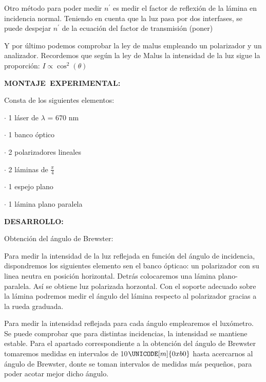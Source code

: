 \documentclass[12pt,thmsa]{article}
\begin{document}
\vspace{1pt}

Otro m\'{e}todo para poder medir $n^{\prime }$ es medir el factor de
reflexi\'{o}n de la l\'{a}mina en incidencia normal. Teniendo en cuenta que
la luz pasa por dos interfases, se puede despejar $n^{\prime }$ de la
ecuaci\'{o}n del factor de transmisi\'{o}n (poner)

\vspace{1pt}

Y por \'{u}ltimo podemos comprobar la ley de malus empleando un polarizador
y un analizador. Recordemos que seg\'{u}n la ley de Malus la intensidad de
la luz sigue la proporci\'{o}n: $I\varpropto \cos ^{2}(\theta )$

\vspace{1pt}

\textbf{MONTAJE\ EXPERIMENTAL: }

Consta de los siguientes elementos:

$\cdot$ 1 l\'{a}ser de $\lambda $ = 670 nm

$\cdot$ 1 banco \'{o}ptico

$\cdot$ 2 polarizadores lineales

$\cdot $ 2 l\'{a}minas de $\frac{\pi }{4}$

$\cdot$ 1 espejo plano

$\cdot $ 1 l\'{a}mina plano paralela

\vspace{1pt}

\textbf{DESARROLLO:}

\vspace{1pt}Obtenci\'{o}n del \'{a}ngulo de Brewster:

Para medir la intensidad de la luz reflejada en funci\'{o}n del \'{a}ngulo
de incidencia, dispondremos los siguientes elemento sen el banco
\'{o}pticao: un polarizador con su linea neutra en posici\'{o}n horizontal.
Detr\'{a}s colocaremos una l\'{a}mina plano-paralela. As\'{i} se obtiene luz
polarizada horzontal. Con el soporte adecuado sobre la l\'{a}mina podremos
medir el \'{a}ngulo del l\'{a}mina respecto al polarizador gracias a la
rueda graduada.

Para medir la intensidad reflejada para cada \'{a}ngulo emplearemos el
lux\'{o}metro. Se puede comprobar que para distintas incidencias, la
intensidad se mantiene estable. Para el apartado correspondiente a la
obtenci\'{o}n del \'{a}ngulo de Brewster tomaremos medidas en intervalos de
10$\UNICODE[m]{0xb0}$ hasta acercarnos al \'{a}ngulo de Brewster, donte se
toman intervalos de medidas m\'{a}s peque\~{n}os, para poder acotar mejor
dicho \'{a}ngulo.
\end{document}
